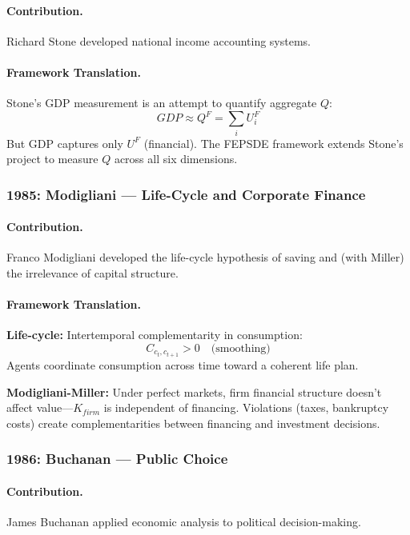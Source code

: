 \paragraph{Contribution.}
Richard Stone developed national income accounting systems.

\paragraph{Framework Translation.}
Stone's GDP measurement is an attempt to quantify aggregate $Q$:
\begin{equation}
  GDP \approx Q^F = \sum_i U^F_i
\end{equation}
But GDP captures only $U^F$ (financial). The FEPSDE framework extends
Stone's project to measure $Q$ across all six dimensions.

\subsubsection{1985: Modigliani --- Life-Cycle and Corporate Finance}

\paragraph{Contribution.}
Franco Modigliani developed the life-cycle hypothesis of saving and
(with Miller) the irrelevance of capital structure.

\paragraph{Framework Translation.}
\textbf{Life-cycle:} Intertemporal complementarity in consumption:
\begin{equation}
  C_{c_t, c_{t+1}} > 0 \quad \text{(smoothing)}
\end{equation}
Agents coordinate consumption across time toward a coherent life plan.

\textbf{Modigliani-Miller:} Under perfect markets, firm financial structure
doesn't affect value---$K_{firm}$ is independent of financing.
Violations (taxes, bankruptcy costs) create complementarities between
financing and investment decisions.

\subsubsection{1986: Buchanan --- Public Choice}

\paragraph{Contribution.}
James Buchanan applied economic analysis to political decision-making.

